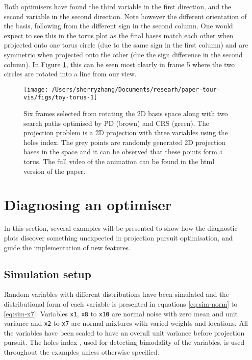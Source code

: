 Both optimisers have found the third variable in the first direction,
and the second variable in the second direction. Note however the
different orientation of the basis, following from the different sign in
the second column. One would expect to see this in the torus plot as the
final bases match each other when projected onto one torus circle (due
to the same sign in the first column) and are symmetric when projected
onto the other (due the sign difference in the second column). In Figure
\ref{fig:toy-torus}, this can be seen most clearly in frame 5 where the
two circles are rotated into a line from our view.

\begin{Schunk}
\begin{figure}

{\centering \texttt{[image: /Users/sherryzhang/Documents/researh/paper-tour-vis/figs/toy-torus-1]} 

}

\caption[Six frames selected from rotating the 2D basis space along with two search paths optimised by PD (brown) and CRS (green)]{Six frames selected from rotating the 2D basis space along with two search paths optimised by PD (brown) and CRS (green). The projection problem is a 2D projection with three variables using the holes index. The grey points are randomly generated 2D projection bases in the space and it can be observed that these points form a torus. The full video of the animation can be found in the html version of the paper.}\label{fig:toy-torus}
\end{figure}
\end{Schunk}

\hypertarget{application}{%
\section{Diagnosing an optimiser}\label{application}}

In this section, several examples will be presented to show how the
diagnostic plots discover something unexpected in projection pursuit
optimisation, and guide the implementation of new features.

\hypertarget{simulation-setup}{%
\subsection{Simulation setup}\label{simulation-setup}}

Random variables with different distributions have been simulated and
the distributional form of each variable is presented in equations
\ref{eq:sim-norm} to \ref{eq:sim-x7}. Variables \texttt{x1}, \texttt{x8}
to \texttt{x10} are normal noise with zero mean and unit variance and
\texttt{x2} to \texttt{x7} are normal mixtures with varied weights and
locations. All the variables have been scaled to have an overall unit
variance before projection pursuit. The holes index
\citep{cook2008grand}, used for detecting bimodality of the variables,
is used throughout the examples unless otherwise specified.

